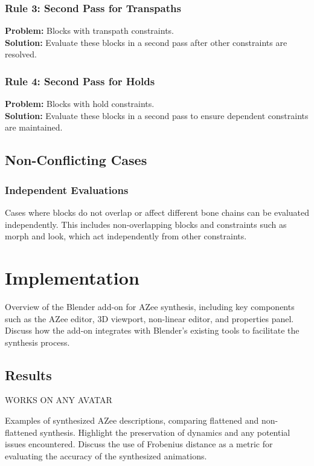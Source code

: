 \documentclass[../../main.tex]{subfiles}
\begin{document}
\subsubsection{Rule 3: Second Pass for Transpaths}
\textbf{Problem:} Blocks with transpath constraints.\\
\textbf{Solution:} Evaluate these blocks in a second pass after other constraints are resolved.

\subsubsection{Rule 4: Second Pass for Holds}
\textbf{Problem:} Blocks with hold constraints.\\
\textbf{Solution:} Evaluate these blocks in a second pass to ensure dependent constraints are maintained.

\subsection{Non-Conflicting Cases}
\subsubsection{Independent Evaluations}
Cases where blocks do not overlap or affect different bone chains can be evaluated independently. This includes non-overlapping blocks and constraints such as morph and look, which act independently from other constraints.

\section{Implementation}

Overview of the Blender add-on for AZee synthesis, including key components such as the AZee editor, 3D viewport, non-linear editor, and properties panel. Discuss how the add-on integrates with Blender's existing tools to facilitate the synthesis process.

\subsection{Results}

WORKS ON ANY AVATAR

Examples of synthesized AZee descriptions, comparing flattened and non-flattened synthesis. Highlight the preservation of dynamics and any potential issues encountered. Discuss the use of Frobenius distance as a metric for evaluating the accuracy of the synthesized animations.
\end{document}
